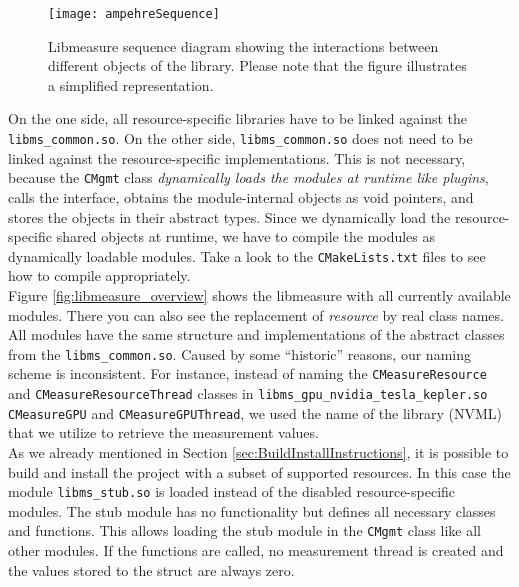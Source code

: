 \begin{figure}
\begin{center}
\texttt{[image: ampehreSequence]} 
\caption{Libmeasure sequence diagram showing the interactions between different objects of the library. Please note that the figure illustrates a simplified representation.}
\label{fig:libmeasureSequence}
\end{center}
\end{figure}

On the one side, all resource-specific libraries have to be linked against the \texttt{libms\_common.so}. On the other side, \texttt{libms\_common.so} does not need to be linked against the resource-specific implementations. This is not necessary, because the \texttt{CMgmt} class \textit{dynamically loads the modules at runtime like plugins}, calls the interface, obtains the module-internal objects as void pointers, and stores the objects in their abstract types. Since we dynamically load the resource-specific shared objects at runtime, we have to compile the modules as dynamically loadable modules. Take a look to the \texttt{CMakeLists.txt} files to see how to compile appropriately.\\

Figure \ref{fig:libmeasure_overview} shows the libmeasure with all currently available modules. There you can also see the replacement of \textit{resource} by real class names. All modules have the same structure and implementations of the abstract classes from the \texttt{libms\_common.so}. Caused by some ``historic'' reasons, our naming scheme is inconsistent. For instance, instead of naming the \texttt{CMeasureResource} and \texttt{CMeasureResourceThread} classes in \texttt{libms\_gpu\_nvidia\_tesla\_kepler.so} \\\texttt{CMeasureGPU} and \texttt{CMeasureGPUThread}, we used the name of the library (NVML) that we utilize to retrieve the measurement values.\\

As we already mentioned in Section \ref{sec:BuildInstallInstructions}, it is possible to build and install the project with a subset of supported resources. In this case the module \texttt{libms\_stub.so} is loaded instead of the disabled resource-specific modules. The stub module has no functionality but defines all necessary classes and functions. This allows loading the stub module in the \texttt{CMgmt} class like all other modules. If the functions are called, no measurement thread is created and the values stored to the  struct are always zero.

